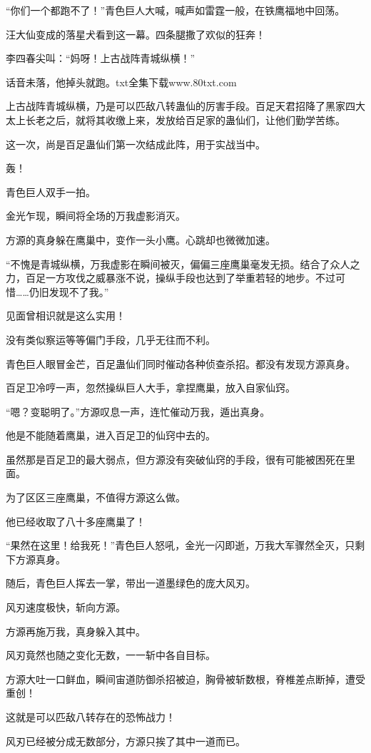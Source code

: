 \begin{this_body}
“你们一个都跑不了！”青色巨人大喊，喊声如雷霆一般，在铁鹰福地中回荡。

汪大仙变成的落星犬看到这一幕。四条腿撒了欢似的狂奔！

李四春尖叫：“妈呀！上古战阵青城纵横！”

话音未落，他掉头就跑。txt全集下载www.80txt.com

上古战阵青城纵横，乃是可以匹敌八转蛊仙的厉害手段。百足天君招降了黑家四大太上长老之后，就将其收缴上来，发放给百足家的蛊仙们，让他们勤学苦练。

这一次，尚是百足蛊仙们第一次结成此阵，用于实战当中。

轰！

青色巨人双手一拍。

金光乍现，瞬间将全场的万我虚影消灭。

方源的真身躲在鹰巢中，变作一头小鹰。心跳却也微微加速。

“不愧是青城纵横，万我虚影在瞬间被灭，偏偏三座鹰巢毫发无损。结合了众人之力，百足一方攻伐之威暴涨不说，操纵手段也达到了举重若轻的地步。不过可惜……仍旧发现不了我。”

见面曾相识就是这么实用！

没有类似察运等等偏门手段，几乎无往而不利。

青色巨人眼冒金芒，百足蛊仙们同时催动各种侦查杀招。都没有发现方源真身。

百足卫冷哼一声，忽然操纵巨人大手，拿捏鹰巢，放入自家仙窍。

“嗯？变聪明了。”方源叹息一声，连忙催动万我，遁出真身。

他是不能随着鹰巢，进入百足卫的仙窍中去的。

虽然那是百足卫的最大弱点，但方源没有突破仙窍的手段，很有可能被困死在里面。

为了区区三座鹰巢，不值得方源这么做。

他已经收取了八十多座鹰巢了！

“果然在这里！给我死！”青色巨人怒吼，金光一闪即逝，万我大军骤然全灭，只剩下方源真身。

随后，青色巨人挥去一掌，带出一道墨绿色的庞大风刃。

风刃速度极快，斩向方源。

方源再施万我，真身躲入其中。

风刃竟然也随之变化无数，一一斩中各自目标。

方源大吐一口鲜血，瞬间宙道防御杀招被迫，胸骨被斩数根，脊椎差点断掉，遭受重创！

这就是可以匹敌八转存在的恐怖战力！

风刃已经被分成无数部分，方源只挨了其中一道而已。


\end{this_body}
